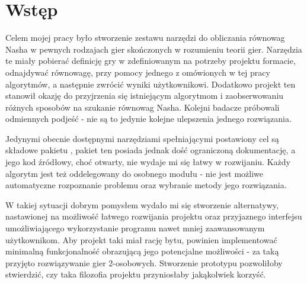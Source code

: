 \documentclass[polish]{standalone}
\begin{document}
\pagestyle{headings}

\section*{Wstęp}

Celem mojej pracy było stworzenie zestawu narzędzi do obliczania równowag Nasha w pewnych rodzajach gier skończonych
w rozumieniu teorii gier. Narzędzia te miały pobierać definicję gry w zdefiniowanym na potrzeby projektu formacie,
odnajdywać równowagę, przy pomocy jednego z omówionych w tej pracy algorytmów, a następnie zwrócić wyniki użytkownikowi.
Dodatkowo projekt ten stanowił okazję do przyjrzenia się istniejącym algorytmom i zaobserwowaniu różnych sposobów na
szukanie równowag Nasha. Kolejni badacze próbowali odmiennych podjeść - nie są to jedynie kolejne ulepszenia jednego
rozwiązania.

Jedynymi obecnie dostępnymi narzędziami spełniającymi postawiony cel są składowe pakietu , pakiet ten
posiada jednak dość ograniczoną dokumentację, a jego kod źródłowy, choć otwarty, nie wydaje mi się łatwy w rozwijaniu.
Każdy algorytm jest też oddelegowany do osobnego modułu - nie jest możliwe automatyczne rozpoznanie problemu oraz wybranie metody jego rozwiązania.

W takiej sytuacji dobrym pomysłem wydało mi się stworzenie alternatywy, nastawionej na możliwość łatwego rozwijania
projektu oraz przyjaznego interfejsu umożliwiającego wykorzystanie programu nawet mniej zaawansowanym użytkownikom. Aby
projekt taki miał rację bytu, powinien implementować minimalną funkcjonalność obrazującą jego potencjalne możliwości
- za taką przyjęto rozwiązywanie gier 2-osobowych. Stworzenie prototypu pozwoliłoby stwierdzić, czy taka filozofia
projektu przyniosłaby jakąkolwiek korzyść.
\end{document}
